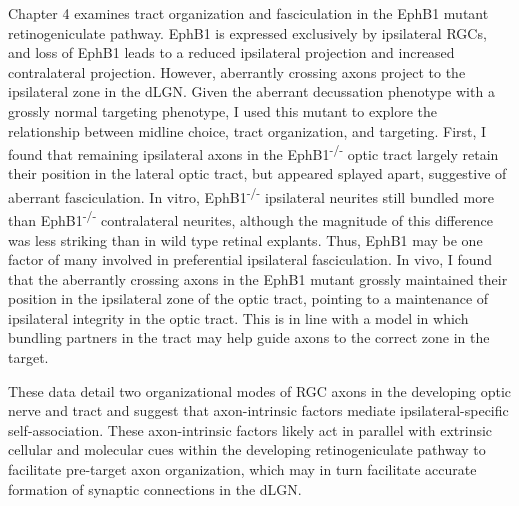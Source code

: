 Chapter 4 examines tract organization and fasciculation in the EphB1 mutant retinogeniculate pathway.
EphB1 is expressed exclusively by ipsilateral RGCs, and loss of EphB1 leads to a reduced ipsilateral projection and increased contralateral projection.
However, aberrantly crossing axons project to the ipsilateral zone in the dLGN.
Given the aberrant decussation phenotype with a grossly normal targeting phenotype, I used this mutant to explore the relationship between midline choice, tract organization, and targeting.
First, I found that remaining ipsilateral axons in the EphB1\textsuperscript{-/-} optic tract largely retain their position in the lateral optic tract, but appeared splayed apart, suggestive of aberrant fasciculation.
In vitro, EphB1\textsuperscript{-/-} ipsilateral neurites still bundled more than EphB1\textsuperscript{-/-} contralateral neurites, although the magnitude of this difference was less striking than in wild type retinal explants.
Thus, EphB1 may be one factor of many involved in preferential ipsilateral fasciculation.
In vivo, I found that the aberrantly crossing axons in the EphB1 mutant grossly maintained their position in the ipsilateral zone of the optic tract, pointing to a maintenance of ipsilateral integrity in the optic tract.
This is in line with a model in which bundling partners in the tract may help guide axons to the correct zone in the target.

These data detail two organizational modes of RGC axons in the developing optic nerve and tract and suggest that axon-intrinsic factors mediate ipsilateral-specific self-association.
These axon-intrinsic factors likely act in parallel with extrinsic cellular and molecular cues within the developing retinogeniculate pathway to facilitate pre-target axon organization, which may in turn facilitate accurate formation of synaptic connections in the dLGN.